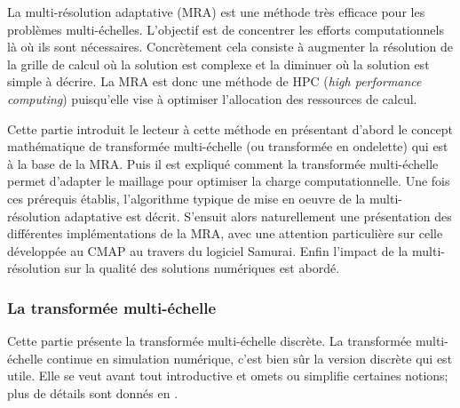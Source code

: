 
La multi-résolution adaptative (MRA) est une méthode très efficace pour les problèmes multi-échelles. 
L'objectif est de concentrer les efforts computationnels là où ils sont nécessaires. 
Concrètement cela consiste à augmenter la résolution de la grille de calcul où la solution est complexe et la diminuer où la solution est simple à décrire.
La MRA est donc une méthode de HPC (\textit{high performance computing}) puisqu'elle vise à optimiser l'allocation des ressources de calcul.\par
Cette partie introduit le lecteur à cette méthode en présentant d'abord le concept mathématique de transformée multi-échelle (ou transformée en ondelette)
qui est à la base de la MRA. 
Puis il est expliqué comment la transformée multi-échelle permet d'adapter le maillage pour optimiser la charge computationnelle.
Une fois ces prérequis établis, l'algorithme typique de mise en oeuvre de la multi-résolution adaptative est décrit.
S’ensuit alors naturellement une présentation des différentes implémentations de la MRA, avec une attention particulière sur celle développée au CMAP au travers 
du logiciel Samurai.
Enfin l'impact de la multi-résolution sur la qualité des solutions numériques est abordé. 

\subsubsection{La transformée multi-échelle}
    Cette partie présente la transformée multi-échelle discrète. La transformée multi-échelle continue en simulation numérique,
    c'est bien sûr la version discrète qui est utile.
    Elle se veut avant tout introductive et omets ou simplifie certaines notions; plus de détails sont donnés en \cite{postePoly}.

